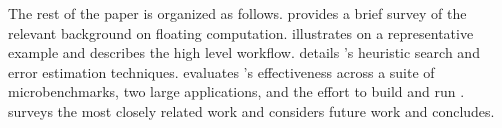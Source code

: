 \documentclass[paper.tex]{subfiles}
\begin{document}
The rest of the paper is organized as follows.  
provides a brief survey of the relevant background on floating
computation.   illustrates \casio on a
representative example and describes the high level \casio workflow.
 details \casio's heuristic search and error
estimation techniques.   evaluates \casio's
effectiveness across a suite of microbenchmarks, two large
applications, and the effort to build and run \casio.
 surveys the most closely related work and
 considers future work and concludes.












\end{document}
